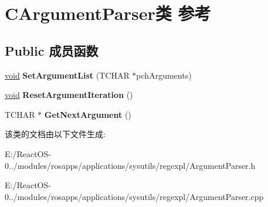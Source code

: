 \hypertarget{class_c_argument_parser}{}\section{C\+Argument\+Parser类 参考}
\label{class_c_argument_parser}
\subsection*{Public 成员函数}
\begin{DoxyCompactItemize}
\item 
\mbox{\label{class_c_argument_parser_a81633c43725a134df0d619c3a5e6ad92}} 
\hyperlink{interfacevoid}{void} {\bfseries Set\+Argument\+List} (T\+C\+H\+AR $\ast$pch\+Arguments)
\item 
\mbox{\label{class_c_argument_parser_ab64f0f90e57b2fe7a56d9c77cc621448}} 
\hyperlink{interfacevoid}{void} {\bfseries Reset\+Argument\+Iteration} ()
\item 
\mbox{\label{class_c_argument_parser_adce693a990763382ff7e629f90833dbd}} 
T\+C\+H\+AR $\ast$ {\bfseries Get\+Next\+Argument} ()
\end{DoxyCompactItemize}


该类的文档由以下文件生成\+:\begin{DoxyCompactItemize}
\item 
E\+:/\+React\+O\+S-\/0../modules/rosapps/applications/sysutils/regexpl/Argument\+Parser.\+h\item 
E\+:/\+React\+O\+S-\/0../modules/rosapps/applications/sysutils/regexpl/Argument\+Parser.\+cpp\end{DoxyCompactItemize}
